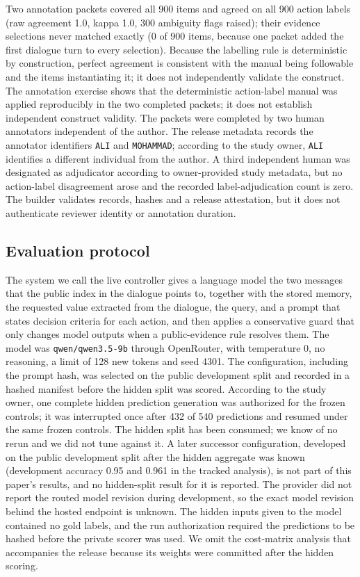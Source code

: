 Two annotation packets covered all 900 items and agreed on all 900 action labels (raw agreement 1.0, kappa 1.0, 300 ambiguity flags raised); their evidence selections never matched exactly (0 of 900 items, because one packet added the first dialogue turn to every selection). Because the labelling rule is deterministic by construction, perfect agreement is consistent with the manual being followable and the items instantiating it; it does not independently validate the construct. The annotation exercise shows that the deterministic action-label manual was applied reproducibly in the two completed packets; it does not establish independent construct validity. The packets were completed by two human annotators independent of the author. The release metadata records the annotator identifiers \texttt{ALI} and \texttt{MOHAMMAD}; according to the study owner, \texttt{ALI} identifies a different individual from the author. A third independent human was designated as adjudicator according to owner-provided study metadata, but no action-label disagreement arose and the recorded label-adjudication count is zero. The builder validates records, hashes and a release attestation, but it does not authenticate reviewer identity or annotation duration.

\subsection{Evaluation protocol}
\label{sec:mgp6-protocol}
The system we call the live controller gives a language model the two messages that the public index in the dialogue points to, together with the stored memory, the requested value extracted from the dialogue, the query, and a prompt that states decision criteria for each action, and then applies a conservative guard that only changes model \abstain{} outputs when a public-evidence rule resolves them. The model was \texttt{qwen/qwen3.5-9b} through OpenRouter, with temperature 0, no reasoning, a limit of 128 new tokens and seed 4301. The configuration, including the prompt hash, was selected on the public development split and recorded in a hashed manifest before the hidden split was scored. According to the study owner, one complete hidden prediction generation was authorized for the frozen controls; it was interrupted once after 432 of 540 predictions and resumed under the same frozen controls. The hidden split has been consumed; we know of no rerun and we did not tune against it. A later successor configuration, developed on the public development split after the hidden aggregate was known (development accuracy 0.95 and 0.961 in the tracked analysis), is not part of this paper's results, and no hidden-split result for it is reported. The provider did not report the routed model revision during development, so the exact model revision behind the hosted endpoint is unknown. The hidden inputs given to the model contained no gold labels, and the run authorization required the predictions to be hashed before the private scorer was used. We omit the cost-matrix analysis that accompanies the release because its weights were committed after the hidden scoring.

